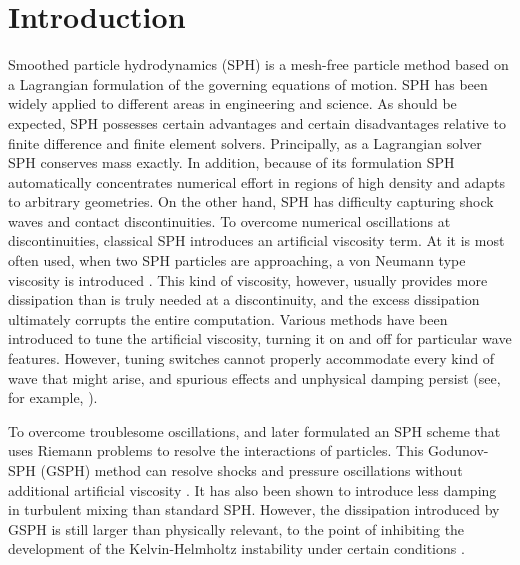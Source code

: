 \documentclass[review]{elsarticle}
\begin{document}
\linenumbers
\section{Introduction}
Smoothed particle hydrodynamics (SPH) \citep{gingold1977smoothed,lucy1977numerical} is a mesh-free particle method based on a Lagrangian formulation of the governing equations of  motion.
SPH has been widely applied to different areas in engineering and science. As
should be expected, SPH possesses certain advantages and certain disadvantages relative to finite difference and finite element solvers. Principally, as a Lagrangian solver SPH conserves mass 
exactly. 
In addition, because of its formulation SPH automatically concentrates numerical effort in regions of
high density and adapts to  arbitrary geometries. On the other hand, 
SPH has difficulty capturing shock waves and contact discontinuities. To overcome numerical
oscillations at discontinuities, classical SPH introduces
an artificial viscosity term. At it is most often used, when two SPH particles
are approaching, a von Neumann type viscosity is introduced
\citep{monaghan1983shock, monaghan1997sph,klapp2012strong}. 
This kind of viscosity, however, 
 usually provides more dissipation  than is truly needed at a discontinuity, and the excess
 dissipation ultimately
 corrupts the entire computation. Various methods have been introduced to tune 
 the artificial viscosity, turning it on and off for particular wave features. However, 
 tuning switches cannot properly accommodate every kind of wave that might arise, 
 and 
 spurious effects and unphysical damping persist (see, for example, \citet{borgani2012hydrodynamic,flebbe1994smoothed,morris1997switch, dolag2005turbulent,cullen2010inviscid,sigalotti2008adaptive,puri2014comparison}).
 
To overcome troublesome oscillations, \cite{inutsuka2002reformulation} and later \cite{cha2003implementations} formulated an SPH scheme that uses Riemann problems to 
resolve the interactions of particles. This Godunov-SPH (GSPH) method can resolve shocks and pressure 
oscillations without additional
artificial viscosity 
 \citep{inutsuka2002reformulation, cha2003implementations,iwasaki2011smoothed, puri2014approximate,borgani2012hydrodynamic}. It has also been shown to introduce less damping in turbulent mixing \citep{cha2010kelvin, borgani2012hydrodynamic} than standard SPH. 
However, the dissipation introduced by GSPH is still larger than physically relevant, to the point
of inhibiting the development of the Kelvin-Helmholtz instability under certain conditions
 \citep{borgani2012hydrodynamic}.
\end{document}

